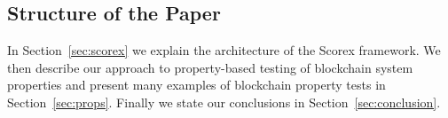 

\subsection{Structure of the Paper}

In Section~\ref{sec:scorex} we explain the architecture of the Scorex framework. We then describe our approach to property-based testing of blockchain system properties and present many examples of blockchain property tests in Section~\ref{sec:props}. Finally we state our conclusions in Section~\ref{sec:conclusion}.
